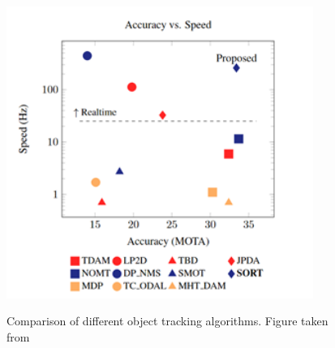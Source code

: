 \documentclass[11pt]{article}		%
\begin{document}
         	\begin{figure}[h]
				\centering
				\includegraphics[width=10cm] {comparison_object_tracking.png}
				\caption{Comparison of different object tracking algorithms. Figure taken from} \cite{object_tracking}
				\label{object_tracking_comp}
			\end{figure}
			
\end{document}
